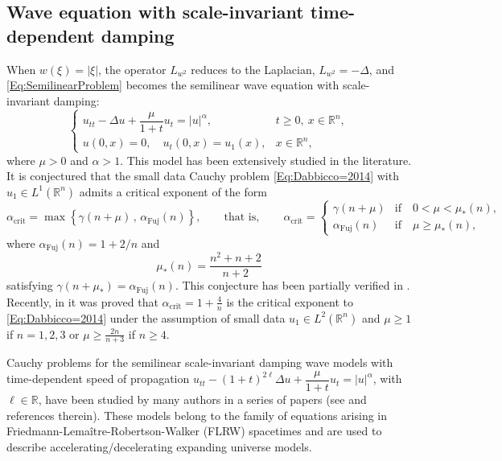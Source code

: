 \documentclass[10pt]{article}
\newcommand{\<}{\langle}
\renewcommand{\>}{\rangle}
\numberwithin{equation}{section}
\begin{document}
\subsection{Wave equation with scale-invariant time-dependent damping} \label{Sect:wave-eq}
When $w(\xi) = |\xi|$, the operator $L_{w^2}$ reduces to the Laplacian, $L_{w^2} = -\Delta$, and \eqref{Eq:SemilinearProblem} becomes the semilinear wave equation with scale-invariant damping:
    \begin{equation}\label{Eq:Dabbicco=2014}
    \begin{cases}
    u_{tt} - \Delta u + \dfrac{\mu}{1+t} u_t = |u|^\alpha, & t \geq 0, \ x \in \mathbb{R}^n, \\
    u(0,x) = 0, \quad u_t(0,x) = u_1(x), & x \in \mathbb{R}^n,
    \end{cases}
    \end{equation}
where $\mu>0$ and $\alpha>1$.  This model has been extensively studied in the literature. It is conjectured that the small data Cauchy problem \eqref{Eq:Dabbicco=2014} with $u_1\in L^1(\mathbb{R}^n)$ admits a critical exponent of the form
\[ \alpha_{\text{crit}} = \max\left\{ \gamma(n+\mu)\,,\,\alpha_{\text{Fuj}}(n) \right\}, \qquad \text{that is}, \qquad \alpha_{\text{crit}} =
\begin{cases}
\gamma(n+\mu) & \text{if} \quad 0<\mu<\mu_*(n), \\
\alpha_{\text{Fuj}}(n) & \text{if} \quad \mu\geq \mu_*(n),
\end{cases} \]
where $\alpha_{\text{Fuj}}(n)=1+2/n$ and
\[ \mu_*(n) = \frac{n^2+n+2}{n+2} \]
satisfying $\gamma(n+\mu_*)=\alpha_{\text{Fuj}}(n)$. This conjecture has been partially verified in \cite{Dabbicco=2014, Dabbicco=2021, Dabbicco-Lucente=2013, Dabbicco-Lucente-Reissig=2015, Ikeda-Sobajima=2018}. \\
Recently,  in \cite{DA26} it was proved that $\alpha_{\text{crit}} = 1+\frac{4}{n}$ is the critical exponent to \eqref{Eq:Dabbicco=2014} under the assumption of small data  $u_1\in L^2(\mathbb{R}^n)$ and $\mu\geq 1$ if $n=1,2,3$ or $\mu\geq \frac{2n}{n+3}$ if $n\geq 4$.

Cauchy problems for the  semilinear   scale-invariant damping
wave models with time-dependent speed of propagation $u_{tt} - (1+t)^{2\ell}\Delta u + \dfrac{\mu}{1+t} u_t = |u|^\alpha$, with $\ell\in \mathbb{R}$, have been studied by many
 authors in a series of papers (see \cite{ AER23, GY25, TW22} and references therein).
  These models belong to the family of equations arising in Friedmann-Lema\^itre-Robertson-Walker (FLRW) spacetimes and are used to describe accelerating/decelerating expanding universe models.
%
\end{document}
